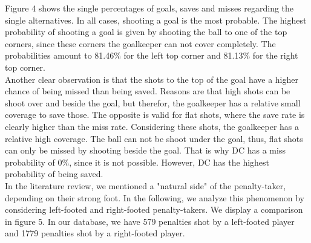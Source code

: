 \documentclass[12pt,dvipsnames]{article}%
\begin{document}
\vspace{-0.3cm}

Figure 4 shows the single percentages of goals, saves and misses regarding the single alternatives. In all cases, shooting a goal is the most probable. The highest probability of shooting a goal is given by shooting the ball to one of the top corners, since these corners the goalkeeper can not cover completely. The probabilities amount to 81.46\% for the left top corner and 81.13\% for the right top corner. \\
Another clear observation is that the shots to the top of the goal have a higher chance of being missed than being saved. Reasons are that high shots can be shoot over and beside the goal, but therefor, the goalkeeper has a relative small coverage to save those. The opposite is valid for flat shots, where the save rate is clearly higher than the miss rate. Considering these shots, the goalkeeper has a relative high coverage. The ball can not be shoot under the goal, thus, flat shots can only be missed by shooting beside the goal. That is why DC has a miss probability of 0\%, since it is not possible. However, DC has the highest probability of being saved. \\
%
In the literature review, we mentioned a "natural side" of the penalty-taker, depending on their strong foot. In the following, we analyze this phenomenon by considering left-footed and right-footed penalty-takers. We display a comparison in figure 5. In our database, we have 579 penalties shot by a left-footed player and 1779 penalties shot by a right-footed player.
\end{document}
